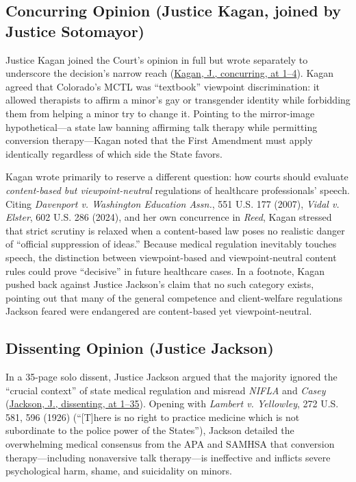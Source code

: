 \documentclass[12pt]{article}
\begin{document}
\subsection{Concurring Opinion (Justice Kagan, joined by Justice Sotomayor)}

Justice Kagan joined the Court's opinion in full but wrote separately to underscore the decision's narrow reach (\href{https://www.supremecourt.gov/opinions/25pdf/24-539_fd9g.pdf}{Kagan, J., concurring, at 1--4}). Kagan agreed that Colorado's MCTL was ``textbook'' viewpoint discrimination: it allowed therapists to affirm a minor's gay or transgender identity while forbidding them from helping a minor try to change it. Pointing to the mirror-image hypothetical---a state law banning affirming talk therapy while permitting conversion therapy---Kagan noted that the First Amendment must apply identically regardless of which side the State favors.

Kagan wrote primarily to reserve a different question: how courts should evaluate \textit{content-based but viewpoint-neutral} regulations of healthcare professionals' speech. Citing \textit{Davenport v. Washington Education Assn.}, 551 U.S. 177 (2007), \textit{Vidal v. Elster}, 602 U.S. 286 (2024), and her own concurrence in \textit{Reed}, Kagan stressed that strict scrutiny is relaxed when a content-based law poses no realistic danger of ``official suppression of ideas.'' Because medical regulation inevitably touches speech, the distinction between viewpoint-based and viewpoint-neutral content rules could prove ``decisive'' in future healthcare cases. In a footnote, Kagan pushed back against Justice Jackson's claim that no such category exists, pointing out that many of the general competence and client-welfare regulations Jackson feared were endangered are content-based yet viewpoint-neutral.

\subsection{Dissenting Opinion (Justice Jackson)}

In a 35-page solo dissent, Justice Jackson argued that the majority ignored the ``crucial context'' of state medical regulation and misread \textit{NIFLA} and \textit{Casey} (\href{https://www.supremecourt.gov/opinions/25pdf/24-539_fd9g.pdf}{Jackson, J., dissenting, at 1--35}). Opening with \textit{Lambert v. Yellowley}, 272 U.S. 581, 596 (1926) (``[T]here is no right to practice medicine which is not subordinate to the police power of the States''), Jackson detailed the overwhelming medical consensus from the APA and SAMHSA that conversion therapy---including nonaversive talk therapy---is ineffective and inflicts severe psychological harm, shame, and suicidality on minors.
\end{document}
